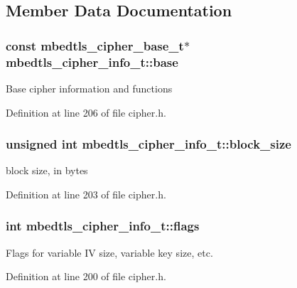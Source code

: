 \subsection{Member Data Documentation}
\hypertarget{structmbedtls__cipher__info__t_ab49e136926e04b02806503deb8844f2d}{
\subsubsection[{base}]{\setlength{\rightskip}{0pt plus 5cm}const {\bf mbedtls\-\_\-cipher\-\_\-base\-\_\-t}$\ast$ mbedtls\-\_\-cipher\-\_\-info\-\_\-t\-::base}}\label{structmbedtls__cipher__info__t_ab49e136926e04b02806503deb8844f2d}
Base cipher information and functions 

Definition at line 206 of file cipher.\-h.

\hypertarget{structmbedtls__cipher__info__t_a7be9560c375110a1d829407e74ab698f}{
\subsubsection[{block\-\_\-size}]{\setlength{\rightskip}{0pt plus 5cm}unsigned int mbedtls\-\_\-cipher\-\_\-info\-\_\-t\-::block\-\_\-size}}\label{structmbedtls__cipher__info__t_a7be9560c375110a1d829407e74ab698f}
block size, in bytes 

Definition at line 203 of file cipher.\-h.

\hypertarget{structmbedtls__cipher__info__t_af0aa5e7fedfd8a85434ec43691d890d8}{
\subsubsection[{flags}]{\setlength{\rightskip}{0pt plus 5cm}int mbedtls\-\_\-cipher\-\_\-info\-\_\-t\-::flags}}\label{structmbedtls__cipher__info__t_af0aa5e7fedfd8a85434ec43691d890d8}
Flags for variable I\-V size, variable key size, etc. 

Definition at line 200 of file cipher.\-h.


